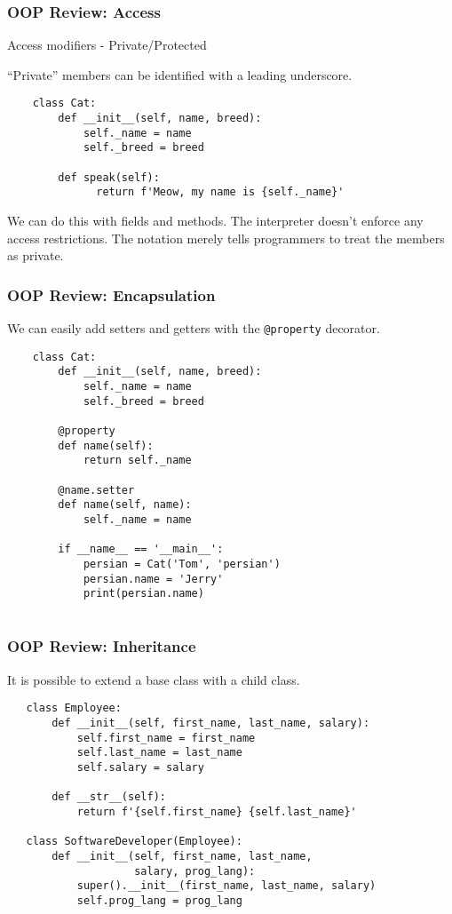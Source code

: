 \documentclass[10pt]{beamer}
\begin{document}
\begin{frame}[fragile]
  \frametitle{OOP Review: Access}
  
   Access modifiers - Private/Protected
   
   ``Private'' members can be identified with a leading underscore.
   
   \begin{verbatim}
    class Cat:
        def __init__(self, name, breed):
            self._name = name
            self._breed = breed
            
        def speak(self):
              return f'Meow, my name is {self._name}'
    \end{verbatim}
    
    We can do this with fields and methods. The interpreter doesn't enforce any access
    restrictions. The notation merely tells programmers to treat the members as private.
     
\end{frame}

\begin{frame}[fragile]
  \frametitle{OOP Review: Encapsulation}
     
   We can easily add setters and getters with the \texttt{@property} decorator.
   
   \begin{verbatim}
    class Cat:
        def __init__(self, name, breed):
            self._name = name
            self._breed = breed
        
        @property
        def name(self):
            return self._name
            
        @name.setter
        def name(self, name):
            self._name = name
            
        if __name__ == '__main__':
            persian = Cat('Tom', 'persian')
            persian.name = 'Jerry'
            print(persian.name)                
            
    \end{verbatim} 
\end{frame}

\begin{frame}[fragile]
  \frametitle{OOP Review: Inheritance}
  It is possible to extend a base class with a child class.
  
  \begin{verbatim}
   class Employee:
       def __init__(self, first_name, last_name, salary):
           self.first_name = first_name
           self.last_name = last_name
           self.salary = salary
           
       def __str__(self):
           return f'{self.first_name} {self.last_name}'
       
   class SoftwareDeveloper(Employee):
       def __init__(self, first_name, last_name, 
                    salary, prog_lang):
           super().__init__(first_name, last_name, salary)
           self.prog_lang = prog_lang  
   \end{verbatim}         
\end{frame}
\end{document}
